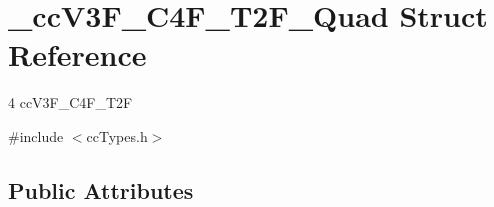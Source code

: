 \hypertarget{struct__cc_v3_f___c4_f___t2_f___quad}{\section{\-\_\-cc\-V3\-F\-\_\-\-C4\-F\-\_\-\-T2\-F\-\_\-\-Quad Struct Reference}
\label{struct__cc_v3_f___c4_f___t2_f___quad}
}


4 cc\-V3\-F\-\_\-\-C4\-F\-\_\-\-T2\-F  




{\ttfamily \#include $<$cc\-Types.\-h$>$}

\subsection*{Public Attributes}
